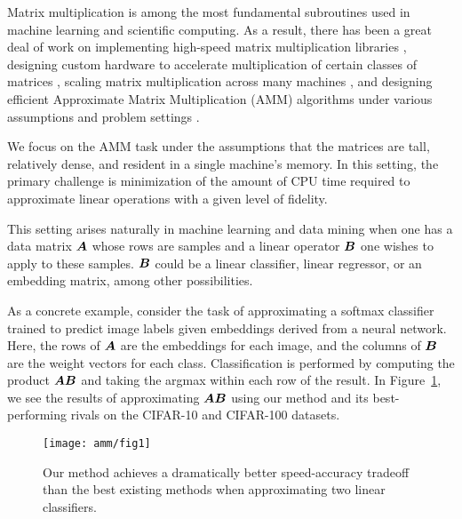 
Matrix multiplication is among the most fundamental subroutines used in machine learning and scientific computing. As a result, there has been a great deal of work on implementing high-speed matrix multiplication libraries \cite{pytorch,eigen,tensorflow}, designing custom hardware to accelerate multiplication of certain classes of matrices \cite{eie,eyeriss,scnn,tpu}, scaling matrix multiplication across many machines \cite{distributedCoded, shortDot, entangledPolynomial, matmulCommunicationBounds}, and designing efficient Approximate Matrix Multiplication (AMM) algorithms under various assumptions and problem settings \cite{drineas_fast_2006,manne_fast_2014,ye_frequent_2016,mroueh_co-occuring_2016,bolt}.

We focus on the AMM task under the assumptions that the matrices are tall, relatively dense, and resident in a single machine's memory. In this setting, the primary challenge is minimization of the amount of CPU time required to approximate linear operations with a given level of fidelity.

This setting arises naturally in machine learning and data mining when one has a data matrix $\bm{A}$ whose rows are samples and a linear operator $\bm{B}$ one wishes to apply to these samples. $\bm{B}$ could be a linear classifier, linear regressor, or an embedding matrix, among other possibilities.

As a concrete example, consider the task of approximating a softmax classifier trained to predict image labels given embeddings derived from a neural network. Here, the rows of $\bm{A}$ are the embeddings for each image, and the columns of $\bm{B}$ are the weight vectors for each class. Classification is performed by computing the product $\bm{A}\bm{B}$ and taking the argmax within each row of the result.
In Figure~\ref{fig:fig1}, we see the results of approximating $\bm{A}\bm{B}$ using our method and its best-performing rivals \cite{hashjl, sparsePCA} on the CIFAR-10 and CIFAR-100 datasets.
\vspace{1mm}
\begin{figure}[h]
\begin{center}
\texttt{[image: amm/fig1]}
\caption{Our method achieves a dramatically better speed-accuracy tradeoff than the best existing methods when approximating two linear classifiers.}
\label{fig:fig1}
\end{center}
\end{figure}
\vspace{-1mm}

